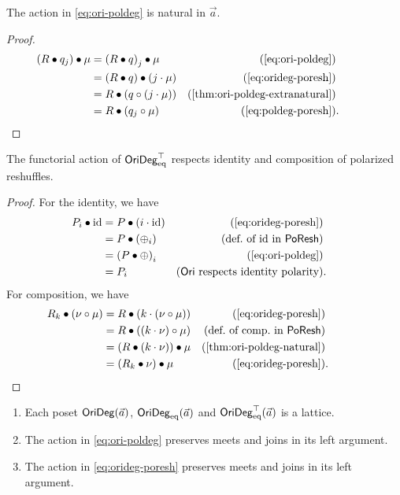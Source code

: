 \documentclass[a4paper]{memoir}
\begin{document}
\begin{proposition} \label{thm:ori-poldeg-natural}
	The action in \cref{eq:ori-poldeg} is natural in $\vec a$.
\end{proposition}
\begin{proof}
	\begin{align*}
		(R \oriof \pdeg q j) \oriof \mu 
		&= \odeg{(R \oriof q)}{j} \oriof \mu 
		& \text{(\cref{eq:ori-poldeg})} \\
		&= (R \oriof q) \oriof (j \cdot \mu)
		& \text{(\cref{eq:orideg-poresh})} \\
		&= R \oriof (q \circ (j \cdot \mu))
		& \text{(\cref{thm:ori-poldeg-extranatural})} \\
		&= R \oriof (\pdeg q j \circ \mu)
		& \text{(\cref{eq:poldeg-poresh})} &. \qquad \qedhere
	\end{align*}
\end{proof}
\begin{proposition} \label{thm:orideg-functor-laws}
	The functorial action of $\mathsf{OriDeg}_{\mathrm{eq}}^\top$ respects identity and composition of polarized reshuffles.
\end{proposition}
\begin{proof}
	For the identity, we have
	\begin{align*}
		\odeg P i \oriof \id
		&= P \oriof (i \cdot \id)
		& \text{(\cref{eq:orideg-poresh})} \\
		&= P \oriof (\pdeg \pospol i)
		& \text{(def.\ of $\id$ in $\poreshcat$)} \\
		&= \odeg{(P \oriof \pospol)}{i}
		& \text{(\cref{eq:ori-poldeg})} \\
		&= \odeg P i
		& \text{($\oripsh$ respects identity polarity)} &.
	\end{align*}
	For composition, we have
	\begin{align*}
		\odeg R k \oriof (\nu \circ \mu)
		&= R \oriof (k \cdot (\nu \circ \mu))
		& \text{(\cref{eq:orideg-poresh})} \\
		&= R \oriof ((k \cdot \nu) \circ \mu)
		& \text{(def.\ of comp.\ in $\poreshcat$)} \\
		&= (R \oriof (k \cdot \nu)) \oriof \mu 
		& \text{(\cref{thm:ori-poldeg-natural})} \\
		&= (\odeg R k \oriof \nu) \oriof \mu 
		& \text{(\cref{eq:orideg-poresh})} &. \qquad \qedhere
	\end{align*}
\end{proof}
\begin{proposition}
	\label{thm:orideg-lattice}
	\label{thm:ori-poldeg-lattice}
	\label{thm:orideg-poresh-lattice}
	\begin{enumerate}
		\item Each poset $\mathsf{OriDeg}(\vec a)$, $\mathsf{OriDeg}_{\mathrm{eq}}(\vec a)$ and $\mathsf{OriDeg}_{\mathrm{eq}}^\top(\vec a)$ is a lattice.
		\item The action in \cref{eq:ori-poldeg} preserves meets and joins in its left argument.
		\item The action in \cref{eq:orideg-poresh} preserves meets and joins in its left argument.
	\end{enumerate}
\end{proposition}
\end{document}
